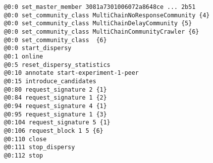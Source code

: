 \begin{lstlisting}[frame=single,caption=One fo the gumby test scenarios,label=list:exp-gumby-scenario,captionpos=b,float]
@0:0 set_master_member 3081a7301006072a8648ce ... 2b51
@0:0 set_community_class MultiChainNoResponseCommunity {4}
@0:0 set_community_class MultiChainDelayCommunity {5}
@0:0 set_community_class MultiChainCommunityCrawler {6}
@0:0 set_community_class  {6}
@0:0 start_dispersy
@0:1 online
@0:5 reset_dispersy_statistics
@0:10 annotate start-experiment-1-peer
@0:15 introduce_candidates
@0:80 request_signature 2 {1}
@0:84 request_signature 1 {2}
@0:94 request_signature 4 {1}
@0:95 request_signature 1 {3}
@0:104 request_signature 5 {1}
@0:106 request_block 1 5 {6}
@0:110 close
@0:111 stop_dispersy
@0:112 stop
\end{lstlisting}
